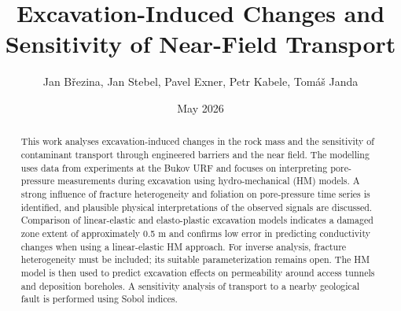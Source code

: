 \documentclass[11pt,a4paper]{article}
\title{Excavation-Induced Changes and Sensitivity of Near-Field Transport}
\author{Jan Březina, Jan Stebel, Pavel Exner, Petr Kabele, Tomáš Janda}
\date{May 2026}
\begin{document}
\maketitle

\begin{abstract}
This work analyses excavation-induced changes in the rock mass and the sensitivity of contaminant transport through engineered barriers and the near field. The modelling uses data from experiments at the Bukov URF and focuses on interpreting pore-pressure measurements during excavation using hydro-mechanical (HM) models. A strong influence of fracture heterogeneity and foliation on pore-pressure time series is identified, and plausible physical interpretations of the observed signals are discussed. Comparison of linear-elastic and elasto-plastic excavation models indicates a damaged zone extent of approximately 0.5 m and confirms low error in predicting conductivity changes when using a linear-elastic HM approach. For inverse analysis, fracture heterogeneity must be included; its suitable parameterization remains open. The HM model is then used to predict excavation effects on permeability around access tunnels and deposition boreholes. A sensitivity analysis of transport to a nearby geological fault is performed using Sobol indices.
\end{abstract}







\appendix


\begingroup
\sloppy
\printbibliography
\endgroup
\end{document}

